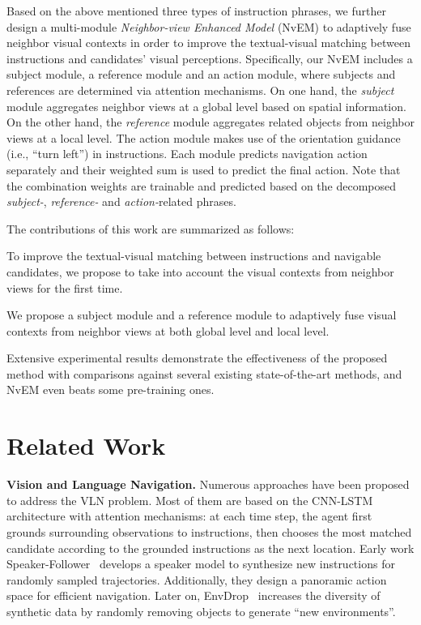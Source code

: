 \documentclass[sigconf]{acmart}
\begin{document}
Based on the above mentioned three types of instruction phrases, we further design a multi-module \textit{Neighbor-view Enhanced Model} (NvEM) to adaptively fuse neighbor visual contexts in order to improve the textual-visual matching between instructions and candidates' visual perceptions. 
Specifically, our NvEM includes a subject module, a reference module and an action module,  where subjects and references are determined via attention mechanisms.
On one hand, the \textit{subject} module aggregates neighbor views at a global level based on spatial information. 
On the other hand, the \textit{reference} module aggregates related objects from neighbor views at a local level.
The action module makes use of the  orientation guidance (i.e., ``turn left'') in instructions.
Each module predicts navigation action separately and their weighted sum is used to predict the final action.
Note that the combination weights are trainable and predicted based on the decomposed \textit{subject-}, \textit{reference-} and \textit{action-}related phrases.


The contributions of this work are summarized as follows:

 To improve the textual-visual matching between instructions and navigable candidates, we propose to take into account the visual contexts from neighbor views for the first time.

 We propose a subject module and a reference module to adaptively fuse visual contexts from neighbor views at both global level and local level.


 Extensive experimental results demonstrate the effectiveness of the proposed method with comparisons against several existing state-of-the-art methods, and NvEM even beats some pre-training ones.



\vspace{-3mm}
\section{Related Work}


\noindent\textbf{Vision and Language Navigation.} Numerous approaches have been proposed to address the VLN problem.
Most of them are based on the CNN-LSTM architecture with attention mechanisms: at each time step, the agent first grounds surrounding observations to instructions, then chooses the most matched candidate according to the grounded instructions as the next location. 
Early work Speaker-Follower~\cite{fried2018speaker} develops a speaker model to synthesize new instructions for randomly sampled trajectories. 
Additionally, they design a panoramic action space for efficient navigation. 
Later on, EnvDrop~\cite{tan2019envdrop} increases the diversity of synthetic data by randomly removing objects to generate ``new environments''. 
\end{document}
